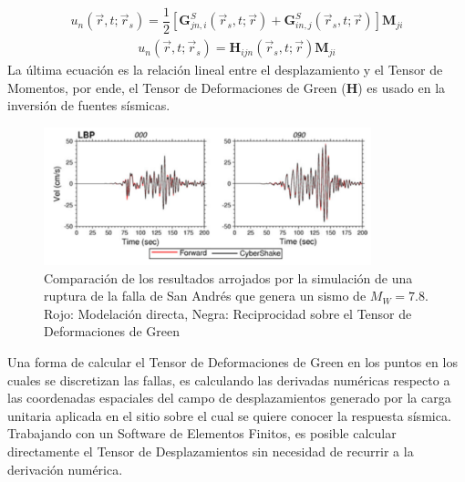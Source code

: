 \begin{frame}[allowframebreaks]
\begin{align*}
	u_n \left( \vec{r}, t; \vec{r}_s \right) = \dfrac{1}{2} \left[ \mathbf{G}_{jn,i}^S \left( \vec{r}_s, t; \vec{r} \right) + \mathbf{G}_{in,j}^S \left( \vec{r}_s, t; \vec{r} \right) \right] \mathbf{M}_{ji}
\end{align*}
\begin{align*}
	u_n \left( \vec{r}, t; \vec{r}_s \right) = \mathbf{H}_{ijn} \left( \vec{r}_s, t; \vec{r} \right) \mathbf{M}_{ji}
\end{align*}
%
\justifying
La última ecuación es la relación lineal entre el desplazamiento y el Tensor de Momentos, por ende, el Tensor de Deformaciones de Green ($\mathbf{H}$) es usado en la inversión de fuentes sísmicas. \cite{zhaogreen}
%
\begin{figure}[h]
	\centering
	\includegraphics[height=4cm]{img/Inversion.pdf}
	\caption{Comparación de los resultados arrojados por la simulación de una ruptura de la falla de San Andrés que genera un sismo de $M_W=7.8$. Rojo: Modelación directa, Negra: Reciprocidad sobre el Tensor de Deformaciones de Green \cite[figura 5, página 7]{gravesetal}}
	\vspace{-.5 cm}
\end{figure}
%
\justifying
Una forma de calcular el Tensor de Deformaciones de Green en los puntos en los cuales se discretizan las fallas, es calculando las derivadas numéricas respecto a las coordenadas espaciales del campo de desplazamientos generado por la carga unitaria aplicada en el sitio sobre el cual se quiere conocer la respuesta sísmica.\\
%
Trabajando con un Software de Elementos Finitos, es posible calcular directamente el Tensor de Desplazamientos sin necesidad de recurrir a la derivación numérica.
%
%
\end{frame}
%
%
